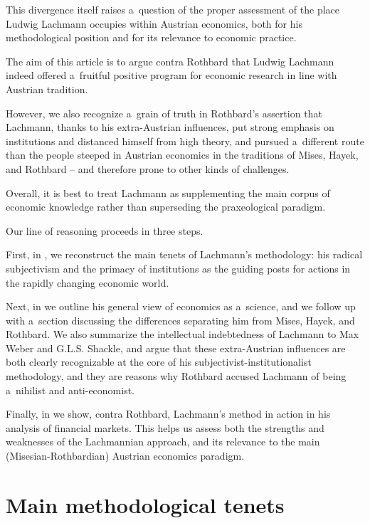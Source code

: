 {This divergence itself raises a~question of the proper assessment of the place Ludwig Lachmann occupies within Austrian economics, both for his methodological position and for its relevance to economic practice.



The aim of this article is to argue contra Rothbard that Ludwig Lachmann indeed offered a~fruitful positive program for economic research in line with Austrian tradition.

However, we also recognize a~grain of truth in Rothbard's assertion that Lachmann, thanks to his extra-Austrian influences, put strong emphasis on institutions and distanced himself from high theory, and pursued a~different route than the people steeped in Austrian economics in the traditions of Mises, Hayek, and Rothbard -- and therefore prone to other kinds of challenges.

Overall, it is best to treat Lachmann as supplementing the main corpus of economic knowledge rather than superseding the praxeological paradigm.



Our line of reasoning proceeds in three steps.

First, in , we reconstruct the main tenets of Lachmann's methodology: his radical subjectivism and the primacy of institutions as the guiding posts for actions in the rapidly changing economic world.

Next, in  we outline his general view of economics as a~science, and we follow up with a~section discussing the differences separating him from Mises, Hayek, and Rothbard. We also summarize the intellectual indebtedness of Lachmann to Max Weber and G.L.S. Shackle, and argue that these extra-Austrian influences are both clearly recognizable at the core of his subjectivist-institutionalist methodology, and they are reasons why Rothbard accused Lachmann of being a~nihilist and anti-economist.

Finally, in  we show, contra Rothbard, Lachmann's method in action in his analysis of financial markets. This helps us assess both the strengths and weaknesses of the Lachmannian approach, and its relevance to the main (Misesian-Rothbardian) Austrian economics paradigm.



\section{Main methodological tenets}

}
